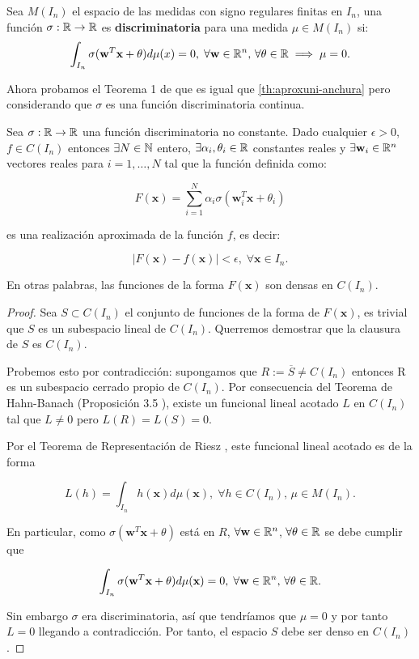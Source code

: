 \begin{definicion}
  Sea $M(I_n)$ el espacio de las medidas con signo regulares finitas en $I_n$, una función $\sigma: \mathbb{R} \to \mathbb{R}$ es \textbf{discriminatoria} para una medida $\mu \in M(I_n)$ si:
  $$\int_{I_n} \sigma(\textbf{w}^T \textbf{x} + \theta) d\mu(x) = 0, \; \forall \textbf{w} \in \mathbb{R}^n, \, \forall \theta \in \mathbb{R} \implies \mu = 0.$$
  \label{def:discriminatoria}
\end{definicion}

Ahora probamos el Teorema 1 de \cite{cybenko1989approximation} que es igual que \autoref{th:aproxuni-anchura} pero considerando que $\sigma$ es una función discriminatoria continua.

\begin{teorema}
  Sea $\sigma : \mathbb{R} \to \mathbb{R}$ una función discriminatoria no constante. Dado cualquier $\epsilon > 0$, $f \in C(I_n)$ entonces $\exists N \in \mathbb{N}$ entero, $\exists \alpha_i, \theta_i \in \mathbb{R}$ constantes reales y $\exists \textbf{w}_i \in \mathbb{R}^n$ vectores reales para $i = 1, \ldots, N$ tal que la función definida como:

  $$F(\textbf{x}) = \sum \limits^N_{i = 1} \alpha_i \sigma \left(\textbf{w}^T_i \textbf{x} + \theta_i \right)$$

  es una realización aproximada de la función $f$, es decir:

  $$|F(\textbf{x}) - f(\textbf{x})| < \epsilon, \; \forall \textbf{x} \in I_n.$$

  En otras palabras, las funciones de la forma $F(\textbf{x})$ son densas en $C(I_n)$.
  \label{th:uni1}
\end{teorema}

\begin{proof}
  Sea $S \subset C(I_n)$ el conjunto de funciones de la forma de $F(\textbf{x})$, es trivial que $S$ es un subespacio lineal de $C(I_n)$. Querremos demostrar que la clausura de $S$ es $C(I_n)$.

  Probemos esto por contradicción: supongamos que $R := \overline{S} \neq C(I_n)$ entonces R es un subespacio cerrado propio de $C(I_n)$. Por consecuencia del Teorema de Hahn-Banach (Proposición 3.5 \cite{rudin1973functional}), existe un funcional lineal acotado $L$ en $C(I_n)$ tal que $L \neq 0$ pero $L(R) = L(S) = 0$.

  Por el Teorema de Representación de Riesz \cite{rudin2006real}, este funcional lineal acotado es de la forma

  $$L(h) = \int_{I_n} h(\textbf{x}) d\mu(\textbf{x}), \; \forall h \in C(I_n), \, \mu \in M(I_n).$$

  En particular, como $\sigma(\textbf{w}^T \textbf{x} + \theta)$ está en $R$, $\forall \textbf{w} \in \mathbb{R}^n$, $\forall \theta \in \mathbb{R}$ se debe cumplir que

  $$\int_{I_n} \sigma(\textbf{w}^T \textbf{x} + \theta) d\mu(\textbf{x}) = 0, \; \forall \textbf{w} \in \mathbb{R}^n, \, \forall \theta \in \mathbb{R}.$$

  Sin embargo $\sigma$ era discriminatoria, así que tendríamos que $\mu = 0$  y por tanto $L = 0$ llegando a contradicción. Por tanto, el espacio $S$ debe ser denso en $C(I_n)$.
\end{proof}

